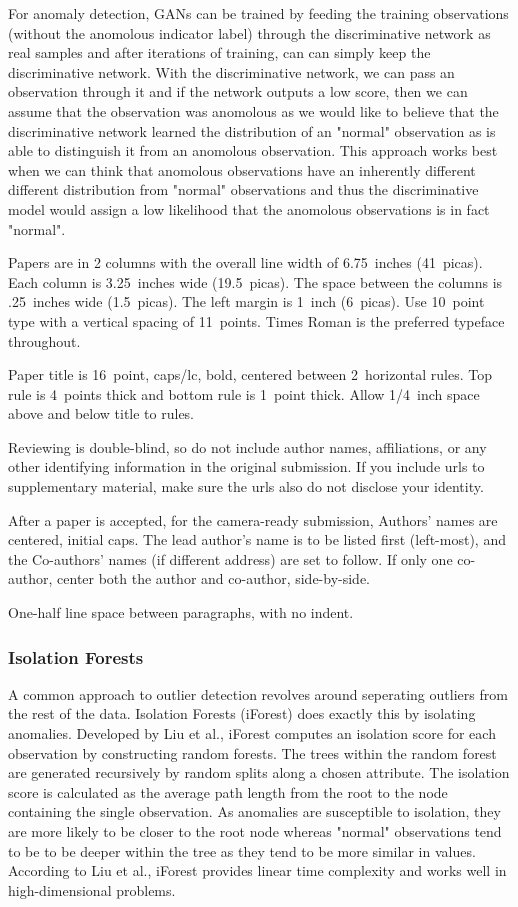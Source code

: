 \documentclass[letterpaper]{article}
\begin{document}
For anomaly detection, GANs can be trained by feeding the training observations (without the anomolous indicator label) through the discriminative network as real samples and 
after iterations of training, can can simply keep the discriminative network.
With the discriminative network, we can pass an observation through it and if the network outputs a low score, then we can assume that the observation was anomolous
as we would like to believe that the discriminative network learned the distribution of an "normal" observation as is able to distinguish it from an anomolous observation.
This approach works best when we can think that anomolous observations have an inherently different different distribution from "normal" observations and thus
the discriminative model would assign a low likelihood that the anomolous observations is in fact "normal".

Papers are in 2 columns with the overall line width of 6.75~inches
(41~picas).  Each column is 3.25~inches wide (19.5~picas).  The space
between the columns is .25~inches wide (1.5~picas).  The left margin
is 1~inch (6~picas).  Use 10~point type with a vertical spacing of
11~points.  Times Roman is the preferred typeface throughout.

Paper title is 16~point, caps/lc, bold, centered between 2~horizontal
rules.  Top rule is 4~points thick and bottom rule is 1~point thick.
Allow 1/4~inch space above and below title to rules.

Reviewing is double-blind, so do not include author names, affiliations, or any
other identifying information in the original submission.  If you include urls
to supplementary material, make sure the urls also do not disclose your identity.

After a paper is accepted, for the camera-ready submission, Authors' names are
centered, initial caps.  The lead author's name is to be listed first
(left-most), and the Co-authors' names (if different address) are set to
follow.  If only one co-author, center both the author and co-author,
side-by-side.

One-half line space between paragraphs, with no indent.

\subsubsection{Isolation Forests}
A common approach to outlier detection revolves around seperating outliers from the rest of the data.
Isolation Forests (iForest) does exactly this by isolating anomalies.
Developed by Liu et al., iForest computes an isolation score for each observation by constructing random forests.
The trees within the random forest are generated recursively by random splits along a chosen attribute.
The isolation score is calculated as the average path length from the root to the node containing the single observation.
As anomalies are susceptible to isolation, they are more likely to be closer to the root node whereas "normal" observations tend to be to be deeper within the tree as they tend to be more similar in values.
According to Liu et al., iForest provides linear time complexity and works well in high-dimensional problems.
\end{document}
